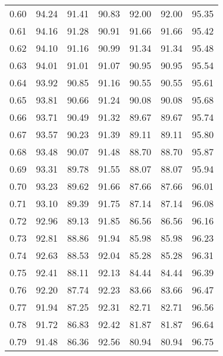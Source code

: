 \begin{tabular}{|c|c|c|c|c|c|c|}
      0.60 &     94.24 &     91.41 &      90.83 &   92.00 &      92.00 &         95.35 \\
      0.61 &     94.16 &     91.28 &      90.91 &   91.66 &      91.66 &         95.42 \\
      0.62 &     94.10 &     91.16 &      90.99 &   91.34 &      91.34 &         95.48 \\
      0.63 &     94.01 &     91.01 &      91.07 &   90.95 &      90.95 &         95.54 \\
      0.64 &     93.92 &     90.85 &      91.16 &   90.55 &      90.55 &         95.61 \\
      0.65 &     93.81 &     90.66 &      91.24 &   90.08 &      90.08 &         95.68 \\
      0.66 &     93.71 &     90.49 &      91.32 &   89.67 &      89.67 &         95.74 \\
      0.67 &     93.57 &     90.23 &      91.39 &   89.11 &      89.11 &         95.80 \\
      0.68 &     93.48 &     90.07 &      91.48 &   88.70 &      88.70 &         95.87 \\
      0.69 &     93.31 &     89.78 &      91.55 &   88.07 &      88.07 &         95.94 \\
      0.70 &     93.23 &     89.62 &      91.66 &   87.66 &      87.66 &         96.01 \\
      0.71 &     93.10 &     89.39 &      91.75 &   87.14 &      87.14 &         96.08 \\
      0.72 &     92.96 &     89.13 &      91.85 &   86.56 &      86.56 &         96.16 \\
      0.73 &     92.81 &     88.86 &      91.94 &   85.98 &      85.98 &         96.23 \\
      0.74 &     92.63 &     88.53 &      92.04 &   85.28 &      85.28 &         96.31 \\
      0.75 &     92.41 &     88.11 &      92.13 &   84.44 &      84.44 &         96.39 \\
      0.76 &     92.20 &     87.74 &      92.23 &   83.66 &      83.66 &         96.47 \\
      0.77 &     91.94 &     87.25 &      92.31 &   82.71 &      82.71 &         96.56 \\
      0.78 &     91.72 &     86.83 &      92.42 &   81.87 &      81.87 &         96.64 \\
      0.79 &     91.48 &     86.36 &      92.56 &   80.94 &      80.94 &         96.75 \\

\end{tabular}
